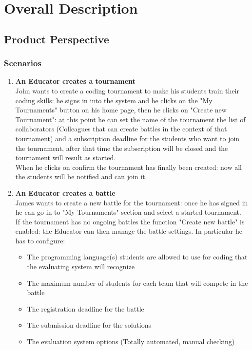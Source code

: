 \documentclass{article}
\begin{document}
\newpage

\section{Overall Description}
\subsection{Product Perspective}
\subsubsection{Scenarios}
\begin{enumerate}
  \item \textbf{An Educator creates a tournament\\}John wants to create a coding tournament to make his students train their
  coding skills: he signs in into the system and he clicks on the "My Tournaments" button on his home page, then he clicks on "Create new Tournament":
  at this point he can set the name of the tournament the list of collaborators (Colleagues that can create battles in the context of that tournament) and a subscription
  deadline for the students who want to join the tournament, after that time the subscription will be closed and the tournament will result as started.\\
  When he clicks on confirm the tournament has finally been created: now all the students will be notified and can join it.\\
  \item \textbf{An Educator creates a battle\\}James wants to create a new battle for the tournament: once he has signed in he can go in to "My Tournaments" section
  and select a started tournament.\\
  If the tournament has no ongoing battles the function "Create new battle" is enabled: the Educator can then manage the battle settings.
  In particular he has to configure:
  \begin{itemize}
    \item The programming language(s) students are allowed to use for coding that the evaluating system will recognize
    \item The maximum number of students for each team that will compete in the battle
    \item The registration deadline for the battle
    \item The submission deadline for the solutions
    \item The evaluation system options (Totally automated, manual checking)

\end{itemize}
\end{enumerate}
\end{document}
